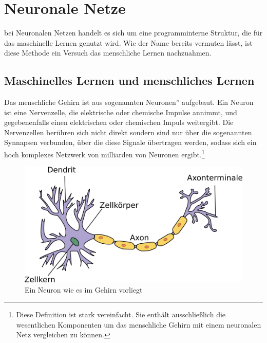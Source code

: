\documentclass{article}
\begin{document}
\section{Neuronale Netze}
bei Neuronalen Netzen handelt es sich um eine programminterne Struktur, die für das maschinelle Lernen genutzt wird. Wie der Name bereits vermuten lässt, ist diese Methode ein Versuch das menschliche Lernen nachzuahmen.
\subsection{Maschinelles Lernen und menschliches Lernen}
Das menschliche Gehirn ist aus sogenannten \glqq Neuronen'' aufgebaut. Ein Neuron ist eine Nervenzelle, die elektrische oder chemische Impulse annimmt, und gegebenenfalls einen elektrischen oder chemischen Impuls weitergibt. Die Nervenzellen berühren sich nicht direkt sondern sind nur über die sogenannten Synnapsen verbunden, über die diese Signale übertragen werden, sodass sich ein hoch komplexes Netzwerk von milliarden von Neuronen ergibt.\footnote{
Diese Definition ist stark vereinfacht. Sie enthält ausschließlich die wesentlichen Komponenten um das menschliche Gehirn mit einem neuronalen Netz vergleichen zu können.}
\begin{figure}[h]
	\centering
	\includegraphics[]{../graphics/Neuron.png}
	\caption[Neuron \newline 
	Quelle: simple.wikipedia.org/wiki/File:Neuron.svg\newline
	Copyright: CC Attribution-Share Alike von Nutzer Dhp1080,\newline
 	bearbeitet]{Ein Neuron wie es im Gehirn vorliegt}
\end{figure}
\end{document}
